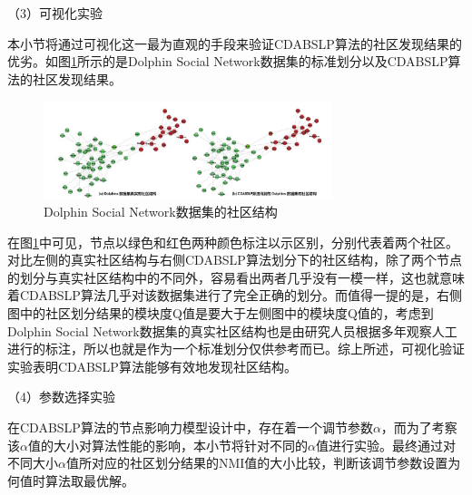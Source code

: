 （3）可视化实验

本小节将通过可视化这一最为直观的手段来验证CDABSLP算法的社区发现结果的优劣。如图\ref{fig:Dolphins}所示的是Dolphin Social Network数据集的标准划分以及CDABSLP算法的社区发现结果。

\begin{figure}
  \centering
  \includegraphics[width=0.75\textwidth]{figures/Dolphins}
  \caption{Dolphin Social Network数据集的社区结构}\label{fig:Dolphins}
\end{figure}

在图\ref{fig:Dolphins}中可见，节点以绿色和红色两种颜色标注以示区别，分别代表着两个社区。对比左侧的真实社区结构与右侧CDABSLP算法划分下的社区结构，除了两个节点的划分与真实社区结构中的不同外，容易看出两者几乎没有一模一样，这也就意味着CDABSLP算法几乎对该数据集进行了完全正确的划分。而值得一提的是，右侧图中的社区划分结果的模块度Q值是要大于左侧图中的模块度Q值的，考虑到Dolphin Social Network数据集的真实社区结构也是由研究人员根据多年观察人工进行的标注，所以也就是作为一个标准划分仅供参考而已。综上所述，可视化验证实验表明CDABSLP算法能够有效地发现社区结构。

（4）参数选择实验

在CDABSLP算法的节点影响力模型设计中，存在着一个调节参数$\alpha$，而为了考察该$\alpha$值的大小对算法性能的影响，本小节将针对不同的$\alpha$值进行实验。最终通过对不同大小$\alpha$值所对应的社区划分结果的NMI值的大小比较，判断该调节参数设置为何值时算法取最优解。

